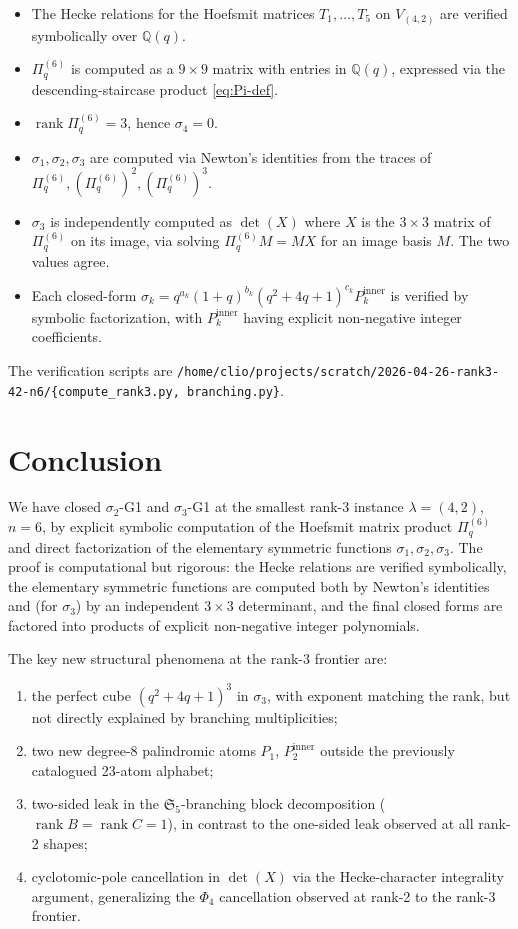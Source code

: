 \documentclass[11pt]{article}
\theoremstyle{plain}
\theoremstyle{definition}
\theoremstyle{remark}
\newcommand{\Q}{\mathbb{Q}}
\newcommand{\Sym}{\mathfrak{S}}
\newcommand{\Pibs}{\Pi_q}
\newcommand{\rank}{\operatorname{rank}}
\begin{document}
\begin{itemize}
\item The Hecke relations for the Hoefsmit matrices $T_1, \ldots, T_5$ on
$V_{(4,2)}$ are verified symbolically over $\Q(q)$.
\item $\Pibs^{(6)}$ is computed as a $9 \times 9$ matrix with entries in
$\Q(q)$, expressed via the descending-staircase product
\eqref{eq:Pi-def}.
\item $\rank \Pibs^{(6)} = 3$, hence $\sigma_4 = 0$.
\item $\sigma_1, \sigma_2, \sigma_3$ are computed via Newton's identities
from the traces of $\Pibs^{(6)}, (\Pibs^{(6)})^2, (\Pibs^{(6)})^3$.
\item $\sigma_3$ is independently computed as $\det(X)$ where $X$ is the
$3 \times 3$ matrix of $\Pibs^{(6)}$ on its image, via solving
$\Pibs^{(6)} M = M X$ for an image basis $M$. The two values agree.
\item Each closed-form $\sigma_k = q^{a_k}(1+q)^{b_k}(q^2+4q+1)^{c_k} P_k^{\mathrm{inner}}$
is verified by symbolic factorization, with $P_k^{\mathrm{inner}}$
having explicit non-negative integer coefficients.
\end{itemize}

The verification scripts are
\verb|/home/clio/projects/scratch/2026-04-26-rank3-42-n6/{compute_rank3.py, branching.py}|.

\section{Conclusion}

We have closed $\sigma_2$-G1 and $\sigma_3$-G1 at the smallest rank-3 instance
$\lambda = (4,2)$, $n = 6$, by explicit symbolic computation of the
Hoefsmit matrix product $\Pibs^{(6)}$ and direct factorization of the
elementary symmetric functions $\sigma_1, \sigma_2, \sigma_3$. The proof is
computational but rigorous: the Hecke relations are verified symbolically,
the elementary symmetric functions are computed both by Newton's identities
and (for $\sigma_3$) by an independent $3 \times 3$ determinant, and the
final closed forms are factored into products of explicit non-negative
integer polynomials.

The key new structural phenomena at the rank-3 frontier are:
\begin{enumerate}[label=(\roman*)]
\item the perfect cube $(q^2 + 4q + 1)^3$ in $\sigma_3$, with exponent
matching the rank, but not directly explained by branching multiplicities;
\item two new degree-8 palindromic atoms $P_1$, $P_2^{\mathrm{inner}}$
outside the previously catalogued 23-atom alphabet;
\item two-sided leak in the $\Sym_5$-branching block decomposition
($\rank B = \rank C = 1$), in contrast to the one-sided leak observed at
all rank-2 shapes;
\item cyclotomic-pole cancellation in $\det(X)$ via the Hecke-character
integrality argument, generalizing the $\Phi_4$ cancellation observed at
rank-2 to the rank-3 frontier.
\end{enumerate}
\end{document}
